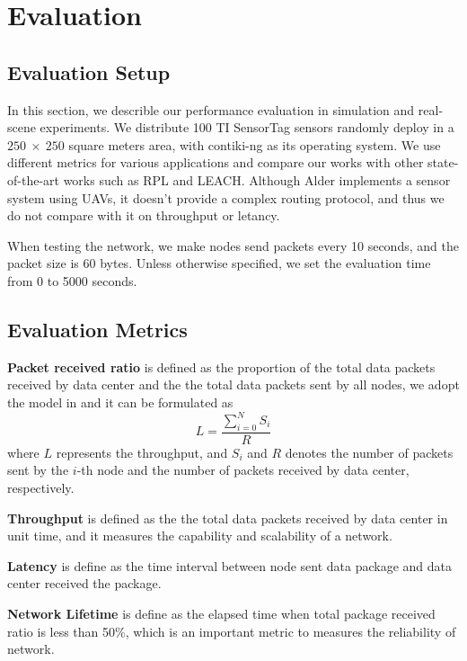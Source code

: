 \section{Evaluation}
\label{Eva}

\subsection{Evaluation Setup} In this section, we describle our performance
evaluation in simulation and real-scene experiments. We distribute 100 TI
SensorTag sensors randomly deploy in a $250~\times~250$ square meters area, with
contiki-ng as its operating system. We use different metrics for various
applications and compare our works with other state-of-the-art works such as RPL
and LEACH. Although Alder implements a sensor system using UAVs, it doesn't
provide a complex routing protocol, and thus we do not compare with it on
throughput or letancy.

When testing the network, we make nodes send packets every 10 seconds, and the
packet size is 60 bytes. Unless otherwise specified, we set the evaluation time
from 0 to 5000 seconds.

\subsection{Evaluation Metrics}

\textbf{Packet received ratio} is defined as the proportion of the total data
packets received by data center and the the total data packets sent by all nodes, 
we adopt the model in \cite{chen2017energy}
and it can be formulated as
\begin{equation}
	L = \frac{\sum_{i = 0}^{N}S_i}{R}
\end{equation}
where $L$ represents the throughput, and $S_i$ and $R$ denotes the number of
packets sent by the $i$-th node and the number of packets received by data
center, respectively.

\textbf{Throughput} is defined as the the total data packets received by data
center in unit time, and it measures the capability and scalability of a network.

\textbf{Latency} is define as the time interval between node sent data package and
data center received the package.

\textbf{Network Lifetime} is define as the elapsed time when total package
received ratio is less than 50\%, which is an important metric to measures the
reliability of network.


